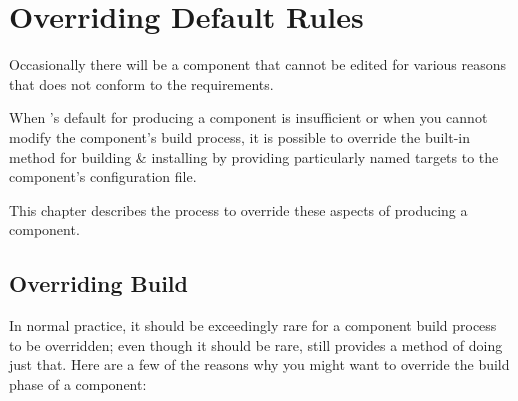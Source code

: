 %
%
%
%
\chapter{Overriding Default Rules} \label{chap:overriding}

Occasionally there will be a component \makefile that cannot be edited
for various reasons that does not conform to the \lmsbw requirements.

When \lmsbw's default for producing a component is insufficient or
when you cannot modify the component's build process, it is possible
to override the built-in method for building \& installing by
providing particularly named targets to the component's configuration
file.

This chapter describes the process to override these aspects of
producing a component.

\section{Overriding Build}\label{overriding:overriding-build}

In normal practice, it should be exceedingly rare for a component
build process to be overridden; even though it should be rare, \lmsbw
still provides a method of doing just that.  Here are a few of the
reasons why you might want to override the build phase of a component:

